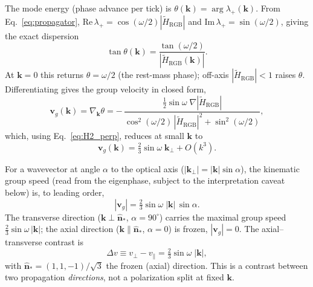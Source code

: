 The mode energy (phase advance per tick) is
$\theta(\mathbf{k}) = \arg\lambda_+(\mathbf{k})$.  From
Eq.~\eqref{eq:propagator}, $\mathrm{Re}\,\lambda_+
= \cos(\omega/2)|\tilde{H}_\text{RGB}|$ and
$\mathrm{Im}\,\lambda_+ = \sin(\omega/2)$, giving the exact dispersion
\begin{equation}
    \tan\theta(\mathbf{k}) = \frac{\tan(\omega/2)}{|\tilde{H}_\text{RGB}(\mathbf{k})|}.
    \label{eq:dispersion_exact}
\end{equation}
At $\mathbf{k}=0$ this returns $\theta=\omega/2$ (the rest-mass phase);
off-axis $|\tilde{H}_\text{RGB}|<1$ raises $\theta$.  Differentiating
gives the group velocity in closed form,
\begin{equation}
    \mathbf{v}_g(\mathbf{k}) = \nabla_{\mathbf{k}}\theta
    = -\,\frac{\tfrac12\sin\omega\;\nabla|\tilde{H}_\text{RGB}|}
             {\cos^2(\omega/2)\,|\tilde{H}_\text{RGB}|^2 + \sin^2(\omega/2)},
    \label{eq:group_velocity}
\end{equation}
which, using Eq.~\eqref{eq:H2_perp}, reduces at small $\mathbf{k}$ to
\begin{equation}
    \mathbf{v}_g(\mathbf{k}) = \tfrac23\sin\omega\;\mathbf{k}_\perp + O(k^3).
    \label{eq:vg_small_k}
\end{equation}

\begin{proposition}
\label{prop:speed_split}
For a wavevector at angle $\alpha$ to the optical axis
($|\mathbf{k}_\perp| = |\mathbf{k}|\sin\alpha$), the kinematic group speed
(read from the eigenphase, subject to the interpretation caveat below) is, to
leading order,
\begin{equation}
    |\mathbf{v}_g| = \tfrac23\sin\omega\;|\mathbf{k}|\,\sin\alpha .
    \label{eq:speed_law}
\end{equation}
The transverse direction ($\mathbf{k}\perp\hat{\mathbf{n}}_*$, $\alpha=90^\circ$)
carries the maximal group speed $\tfrac23\sin\omega\,|\mathbf{k}|$; the axial
direction ($\mathbf{k}\parallel\hat{\mathbf{n}}_*$, $\alpha=0$) is frozen,
$|\mathbf{v}_g|=0$.  The axial--transverse contrast is
\begin{equation}
    \Delta v \equiv v_\perp - v_\parallel = \tfrac23\sin\omega\;|\mathbf{k}|,
    \label{eq:split}
\end{equation}
with $\hat{\mathbf{n}}_* = (1,1,-1)/\sqrt{3}$ the frozen (axial) direction.
This is a contrast between two propagation \emph{directions}, not a
polarization split at fixed $\mathbf{k}$.
\end{proposition}

